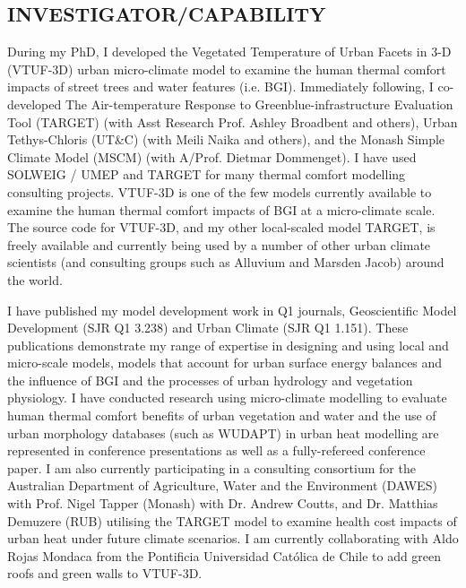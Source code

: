 \subsection*{\TitleFont INVESTIGATOR/CAPABILITY}


During my PhD, I developed the Vegetated Temperature of Urban Facets in 3-D (VTUF-3D)\cite{Nice2018a} urban micro-climate model to examine the human thermal comfort impacts of street trees and water features (i.e. BGI). Immediately following, I co-developed The Air-temperature Response to Greenblue-infrastructure Evaluation Tool (TARGET)\cite{Broadbent2019c} (with Asst Research Prof. Ashley Broadbent and others), Urban Tethys-Chloris (UT\&C)\cite{Meili2020} (with Meili Naika and others), and the Monash Simple Climate Model\cite{Dommenget2019} (MSCM) (with A/Prof. Dietmar Dommenget). I have used SOLWEIG / UMEP\cite{Lindberg2018} and TARGET for many thermal comfort modelling consulting projects. VTUF-3D is one of the few models currently available to examine the human thermal comfort impacts of BGI at a micro-climate scale. The source code for VTUF-3D, and my other local-scaled model TARGET, is freely available and currently being used by a number of other urban climate scientists (and consulting groups such as Alluvium\cite{MosiacInsights2020} and Marsden Jacob) around the world. 

I have published my model development work\cite{Nice2018a,Broadbent2019c,Meili2020,Dommenget2019} in Q1 journals, Geoscientific Model Development (SJR Q1 3.238) and Urban Climate (SJR Q1 1.151). These publications demonstrate my range of expertise in designing and using local and micro-scale models, models that account for urban surface energy balances and the influence of BGI and the processes of urban hydrology and vegetation physiology. I have conducted research using micro-climate modelling to evaluate human thermal comfort benefits of urban vegetation and water and the use of urban morphology databases (such as WUDAPT) in urban heat modelling are represented in conference presentations\cite{Gal2020,Nice2020b} as well as a fully-refereed conference paper\cite{Todorovic2019a}. I am also currently participating in a consulting consortium for the Australian Department of Agriculture, Water and the Environment (DAWES) with Prof. Nigel Tapper (Monash) with Dr. Andrew Coutts, and Dr. Matthias Demuzere (RUB) utilising the TARGET model to examine health cost impacts of urban heat under future climate scenarios. I am currently collaborating with Aldo Rojas Mondaca from the Pontificia Universidad Cat\'{o}lica de Chile to add green roofs and green walls to VTUF-3D.

